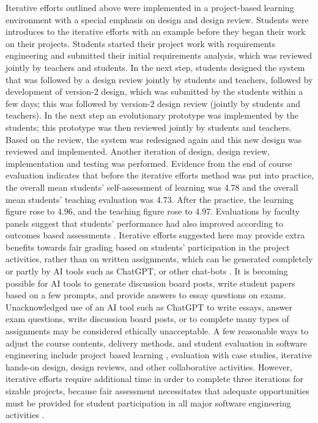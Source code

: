 \documentclass{article}
\begin{document}
Iterative efforts outlined above were implemented in a project-based learning environment \cite{guo} with a special emphasis on design and design review. Students were introduces to the iterative efforts with an example before they began their work on their projects. Students started their project work with requirements engineering and submitted their initial requirements analysis, which was reviewed jointly by teachers and students. In the next step, students designed the system that was followed by a design review jointly by students and teachers, followed by development of version-2 design, which was submitted by the students within a few days; this was followed by version-2 design review (jointly by students and teachers). In the next step an evolutionary prototype was implemented by the students;  this prototype was then reviewed jointly by students and teachers. Based on the review, the system was redesigned again and this new design was reviewed and implemented.  Another iteration of design, design review, implementation and testing was performed.  Evidence from the end of course evaluation indicates that before the iterative efforts method was put into practice, the overall mean students’ self-assessment of learning was 4.78 and the overall mean students’ teaching evaluation was 4.73. After the practice, the learning figure rose to 4.96, and the teaching figure rose to 4.97.  Evaluations by faculty panels suggest that students’ performance had also improved according to outcomes based assessments \cite{guo, sokhan}. Iterative efforts suggested here may provide extra benefits towards fair grading based on students’ participation in the project activities, rather than on written assignments, which can be generated completely or partly by AI tools such as ChatGPT, or other chat-bots \cite{alkhatlan, mollick, welsh}. It is becoming possible for AI tools to generate discussion board posts, write student papers based on a few prompts, and provide answers to essay questions on exams. Unacknowledged use of an AI tool such as ChatGPT to write essays, answer exam questions, write discussion board posts, or to complete many types of assignments may be considered ethically unacceptable. A few reasonable ways to adjust the course contents, delivery methods, and student evaluation in software engineering include project based learning \cite{guo}, evaluation with case studies, iterative hands-on design, design reviews, and other collaborative activities. However, iterative efforts require additional time in order to complete three iterations for sizable projects, because fair assessment necessitates that adequate opportunities must be provided for student participation in all major software engineering activities \cite{guo}.        
\end{document}

